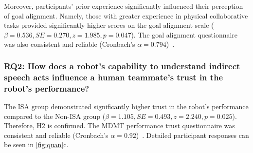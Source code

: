 Moreover, participants' prior experience significantly influenced their perception of goal alignment. Namely, those with greater experience in physical collaborative tasks provided significantly higher scores on the goal alignment scale ($\beta = 0.536, SE = 0.270, z = 1.985, p = 0.047$). The goal alignment questionnaire was also consistent and reliable (Cronbach's $\alpha = 0.794$)~\cite{hoffman2019evaluating}.

\subsubsection{RQ2: How does a robot's capability to understand indirect speech acts influence a human teammate's trust in the robot's performance?}

The ISA group demonstrated significantly higher trust in the robot's performance compared to the Non-ISA group ($\beta = 1.105, SE = 0.493, z = 2.240, p = 0.025$).  Therefore, H2 is confirmed.
The MDMT performance trust questionnaire was consistent and reliable (Cronbach's $\alpha = 0.92$)~\cite{ullman2019mdmt}. Detailed participant responses can be seen in \autoref{fig:quan}c. 

